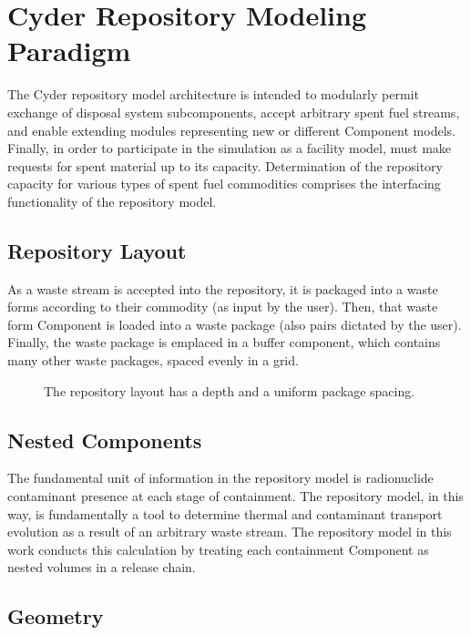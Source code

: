 \section{Cyder Repository Modeling Paradigm}

The Cyder repository model architecture is intended to modularly permit 
exchange of disposal system subcomponents, accept arbitrary spent fuel 
streams, and enable extending modules representing new or different 
Component models.  Finally, in order to participate in the 
simulation as a facility model, must make requests for spent material up 
to its capacity. Determination of the repository capacity for various 
types of spent fuel commodities comprises the interfacing functionality of 
the repository model.

\subsection{Repository Layout}

As a waste stream is accepted into the repository, it is packaged into a waste 
forms according to their commodity (as input by the user). Then, that waste 
form Component is loaded into a waste package (also pairs dictated by the 
user). Finally, the waste package is emplaced in a buffer component, which 
contains many other waste packages, spaced evenly in a grid.

\begin{figure}[htbp!]
\begin{center}
\def\svgwidth{.8\textwidth}

\end{center}
\caption{The repository layout has a depth and a uniform package spacing.}
\label{fig:repo_layout}
\end{figure}

\subsection{Nested Components}

The fundamental unit of information in the repository model is radionuclide 
contaminant presence at each stage of containment.  The repository model, in 
this way, is fundamentally a tool to determine thermal and contaminant 
transport evolution as a result of an arbitrary waste stream. The repository 
model in this work conducts this calculation by  treating each containment 
Component as nested volumes in a release chain. 

\subsection{Geometry}

